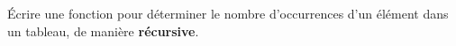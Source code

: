 \documentclass[11pt]{exam}
\begin{document}
%
%
%
%
%
%
%

%
%
%

\begin{questions}

\question \'Ecrire une fonction pour d\'eterminer le nombre d'occurrences d'un \'el\'ement dans un tableau, de mani\`ere \textbf{r\'ecursive}.  

\end{questions}
\end{document}
